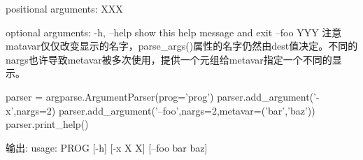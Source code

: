 positional arguments:\newline
 XXX\newline

optional arguments:\newline
 -h, --help  show this help message and exit\newline
 --foo YYY\newline
注意matavar仅仅改变显示的名字，parse\_args()属性的名字仍然由dest值决定。不同的nargs也许导致metavar被多次使用，提供一个元组给metavar指定一个不同的显示。
\begin{python}
parser = argparse.ArgumentParser(prog='prog')
parser.add_argument('-x',nargs=2)
parser.add_argument('--foo',nargs=2,metavar=('bar','baz'))
parser.print_help()
\end{python}
输出:\newline
usage: PROG [-h] [-x X X] [--foo bar baz]\newline

